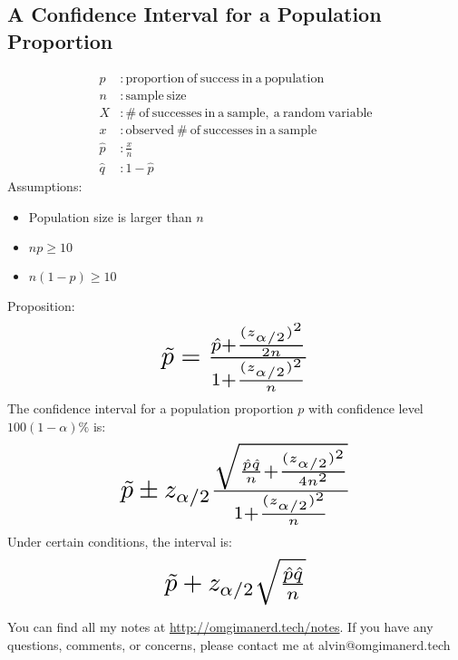 \documentclass[letterpaper, 12pt]{math}
\begin{document}
\subsection*{A Confidence Interval for a Population Proportion}
\begin{align*}
  p&: \mathrm{proportion\ of\ success\ in\ a\ population} \\
  n&: \mathrm{sample\ size} \\
  X&: \mathrm{\#\ of\ successes\ in\ a\ sample,\ a\ random\ variable} \\
  x&: \mathrm{observed\ \#\ of\ successes\ in\ a\ sample} \\
  \hat{p}&: \frac{x}{n} \\
  \hat{q}&: 1-\hat{p}
\end{align*}
Assumptions:
\begin{itemize}
  \item Population size is larger than \( n \)
  \item \( np\geq 10 \)
  \item \( n(1-p)\geq 10 \)
\end{itemize}
Proposition:
\[ \scalebox{2}{$
  \tilde{p} = \frac{\hat{p}+\frac{(z_{\alpha/2})^{2}}{2n}}
  {1+\frac{(z_{\alpha/2})^{2}}{n}}
$} \]
The confidence interval for a population proportion \( p \) with confidence
level \( 100(1-\alpha)\% \) is:
\[ \scalebox{2}{$
  \tilde{p}\pm z_{\alpha/2}\frac{\sqrt{
  \frac{\hat{p}\hat{q}}{n}+\frac{(z_{\alpha/2})^{2}}{4n^{2}}
  }}{1+\frac{(z_{\alpha/2})^{2}}{n}}
$} \]
Under certain conditions, the interval is:
\[ \scalebox{2}{$
  \tilde{p}+z_{\alpha/2}\sqrt{\frac{\hat{p}\hat{q}}{n}}
$} \]

\begin{center}
  You can find all my notes at \url{http://omgimanerd.tech/notes}. If you have
  any questions, comments, or concerns, please contact me at
  alvin@omgimanerd.tech
\end{center}
\end{document}
